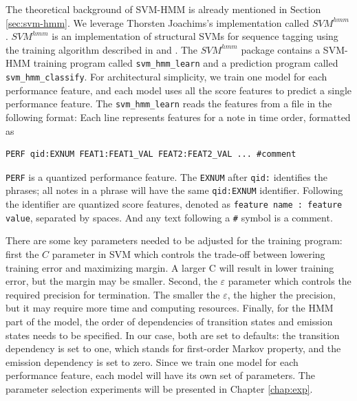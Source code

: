 The theoretical background of SVM-HMM is already mentioned in Section \ref{sec:svm-hmm}. We leverage Thorsten Joachims's implementation called $SVM^{hmm}$ \cite{Joachims2008}. $SVM^{hmm}$ is an implementation of structural SVMs for sequence tagging \cite{svm2003} using the training algorithm described in \cite{svm2005} and \cite{svm2009}. The $SVM^{hmm}$ package contains a SVM-HMM training program called \texttt{svm\_hmm\_learn} and a prediction program called \texttt{svm\_hmm\_classify}. For architectural simplicity, we train one model for each performance feature, and each model uses all the score features to predict a single performance feature. The \texttt{svm\_hmm\_learn} reads the features from a file  in the following format:
Each line represents features for a note in time order, formatted as
\begin{lstlisting}[style=nonumbers]
	PERF qid:EXNUM FEAT1:FEAT1_VAL FEAT2:FEAT2_VAL ... #comment
\end{lstlisting}
\texttt{PERF} is a quantized performance feature. The \texttt{EXNUM} after \texttt{qid:} identifies the phrases; all notes in a phrase will have the same \texttt{qid:EXNUM} identifier. Following the identifier are quantized score features, denoted as \texttt{feature name : feature value}, separated by spaces. And any text following a \texttt{\#} symbol is a comment. %



There are some key parameters needed to be adjusted for the training program: first the $C$ parameter in SVM which controls the trade-off between lowering training error and maximizing margin. A larger C will result in lower training error, but the margin may be smaller. Second, the $\varepsilon$ parameter which controls the required precision for termination. The smaller the $\varepsilon$, the higher the precision, but it may require more time and computing resources. Finally, for the HMM part of the model, the order of dependencies of transition states and emission states needs to be specified. In our case, both are set to defaults: the transition dependency is set to one, which stands for first-order Markov property, and the emission dependency is set to zero. Since we train one model for each performance feature, each model will have its own set of parameters. The parameter selection experiments will be presented in Chapter \ref{chap:exp}.

